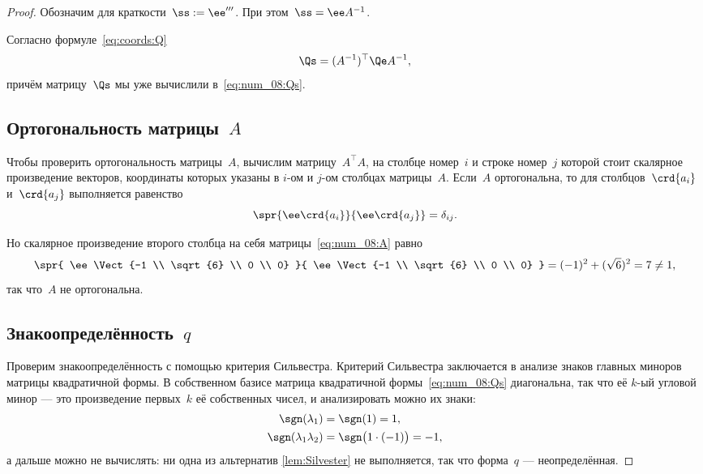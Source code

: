 \begin{proof}
	Обозначим для краткости~$\ss := \ee'''$. При этом~$\ss = \ee A^{-1}$.

	Согласно формуле~\eqref{eq:coords:Q}
	\[
		\Qs = (A^{-1})^\top \Qe A^{-1}
		,
	\]
	причём матрицу~$\Qs$ мы уже вычислили в~\eqref{eq:num_08:Qs}.

	\subsection[Ортогональность матрицы~$A$]{Ортогональность матрицы~$A$}

	Чтобы проверить ортогональность матрицы~$A$, вычислим матрицу~$A^{\top} A$, на столбце номер~$i$ и строке номер~$j$ которой стоит скалярное произведение векторов, координаты которых указаны в $i$-ом и $j$-ом столбцах матрицы~$A$. Если~$A$ ортогональна, то для столбцов~$\crd{a_i}$ и~$\crd{a_j}$ выполняется равенство
	\[
		\spr{\ee \crd{a_i}}{\ee \crd{a_j}} = \delta_{ij}
		.
	\]

	Но скалярное произведение второго столбца на себя матрицы~\eqref{eq:num_08:A} равно
	\[
		\spr{
			\ee
			\Vect{-1 \\ \sqrt{6} \\ 0 \\ 0}
		}{
			\ee
			\Vect{-1 \\ \sqrt{6} \\ 0 \\ 0}
		}
		=
		(-1)^2 + (\sqrt{6})^2 = 7 \neq 1
		,
	\]
	так что~$A$ не ортогональна.

	\subsection[Знакоопределённость~$q$]{Знакоопределённость~$q$}

	Проверим знакоопределённость с помощью критерия Сильвестра. Критерий Сильвестра заключается в анализе знаков главных миноров матрицы квадратичной формы. В собственном базисе матрица квадратичной формы~\eqref{eq:num_08:Qs} диагональна, так что её $k$-ый угловой минор --- это произведение первых~$k$ её собственных чисел, и анализировать можно их знаки:
	\begin{align*}
		\sgn
		(\lambda_1)
		&=
		\sgn(1) = 1,
		\\
		\sgn
		(\lambda_1 \lambda_2)
		&=
		\sgn \bigl( 1 \cdot (-1)\bigr) = -1,
	\end{align*}
	а дальше можно не вычислять: ни одна из альтернатив \cref{lem:Silvester} не выполняется, так что форма~$q$ --- неопределённая.


\end{proof}

